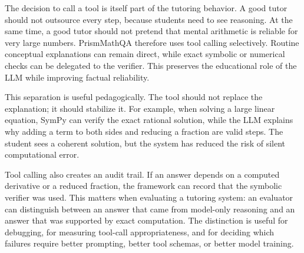The decision to call a tool is itself part of the tutoring behavior. A good tutor should not outsource every step, because students need to see reasoning. At the same time, a good tutor should not pretend that mental arithmetic is reliable for very large numbers. PrismMathQA therefore uses tool calling selectively. Routine conceptual explanations can remain direct, while exact symbolic or numerical checks can be delegated to the verifier. This preserves the educational role of the LLM while improving factual reliability.

This separation is useful pedagogically. The tool should not replace the explanation; it should stabilize it. For example, when solving a large linear equation, SymPy can verify the exact rational solution, while the LLM explains why adding a term to both sides and reducing a fraction are valid steps. The student sees a coherent solution, but the system has reduced the risk of silent computational error.

Tool calling also creates an audit trail. If an answer depends on a computed derivative or a reduced fraction, the framework can record that the symbolic verifier was used. This matters when evaluating a tutoring system: an evaluator can distinguish between an answer that came from model-only reasoning and an answer that was supported by exact computation. The distinction is useful for debugging, for measuring tool-call appropriateness, and for deciding which failures require better prompting, better tool schemas, or better model training.
